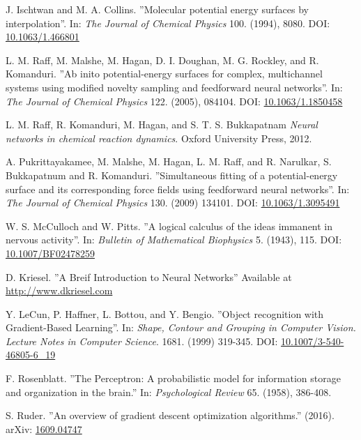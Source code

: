 \documentclass[twoside,english]{uiofysmaster}
\begin{document}
\begin{thebibliography}{56}
 J. Ischtwan and M. A. Collins.
 ''Molecular potential energy surfaces by interpolation''.
 In: \textit{The Journal of Chemical Physics} 100. (1994), 8080.
 DOI: \href{http://dx.doi.org/10.1063/1.466801}{10.1063/1.466801}
 
 L. M. Raff, M. Malshe, M. Hagan, D. I. Doughan, M. G. Rockley, and R. Komanduri.
 ''Ab inito potential-energy surfaces for complex, multichannel systems using modified
 novelty sampling and feedforward neural networks''. 
 In: \textit{The Journal of Chemical Physics} 122. (2005), 084104. 
 DOI: \href{http://dx.doi.org/10.1063/1.1850458}{10.1063/1.1850458}
 
 L. M. Raff, R. Komanduri, M. Hagan, and S. T. S. Bukkapatnam 
 \textit{Neural networks in chemical reaction dynamics}.
 Oxford University Press, 2012.
 
 A. Pukrittayakamee, M. Malshe, M. Hagan, L. M. Raff, and R. Narulkar, 
 S. Bukkapatnum and R. Komanduri. 
 ''Simultaneous fitting of a potential-energy surface and its corresponding force fields
 using feedforward neural networks''. 
 In: \textit{The Journal of Chemical Physics} 130. (2009) 134101.
 DOI: \href{http://dx.doi.org/10.1063/1.3095491}{10.1063/1.3095491}
 
 W. S. McCulloch and W. Pitts.
 ''A logical calculus of the ideas immanent in nervous activity''.
 In: \textit{Bulletin of Mathematical Biophysics} 5. (1943), 115. 
 DOI: \href{http://dx.doi.org/10.1007/BF02478259}{10.1007/BF02478259}
 
 D. Kriesel. 
 ''A Breif Introduction to Neural Networks''
 Available at \href{http://www.dkriesel.com}{http://www.dkriesel.com}
 
 Y. LeCun, P. Haffner, L. Bottou, and Y. Bengio. 
 ''Object recognition with Gradient-Based Learning''.
 In: \textit{Shape, Contour and Grouping in Computer Vision. Lecture Notes in Computer Science}.
 1681. (1999) 319-345. 
 DOI: \href{http://dx.doi.org/10.1007/3-540-46805-6_19}{10.1007/3-540-46805-6\_19}
 
 F. Rosenblatt. 
 ''The Perceptron: A probabilistic model for information storage and organization in the brain.''
 In: \textit{Psychological Review} 65. (1958), 386-408. 
 
 S. Ruder.
 ''An overview of gradient descent optimization algorithms.''
 (2016). 
 arXiv: \href{https://arxiv.org/abs/1609.04747}{1609.04747}
 

\end{thebibliography}
\end{document}
